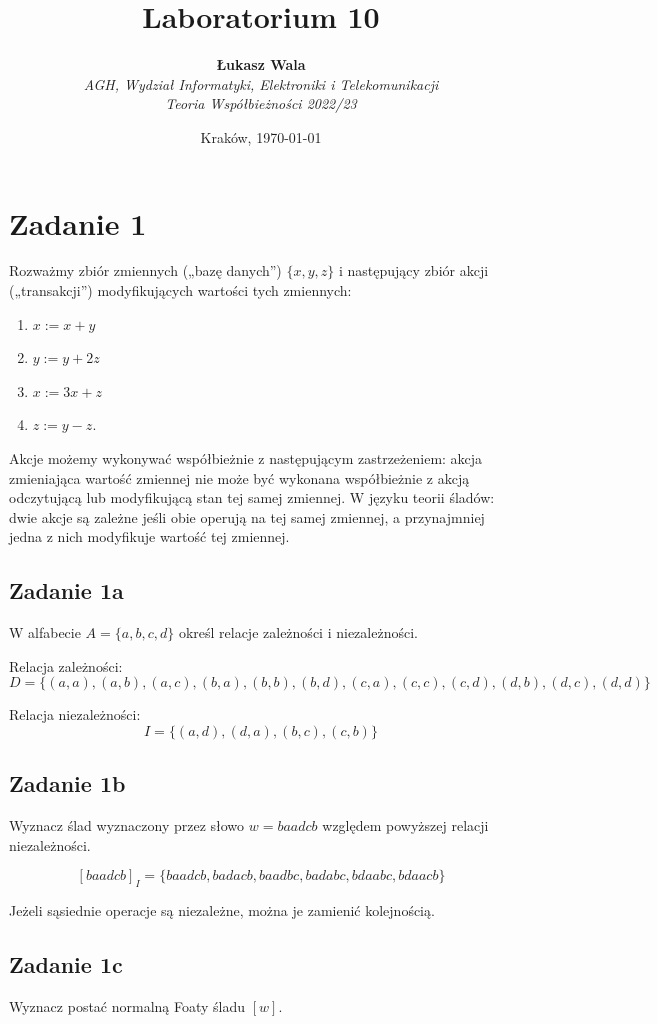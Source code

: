 \documentclass{article}
\title{Laboratorium 10}
\author{\textbf{Łukasz Wala}\\
    \textit{AGH, Wydział Informatyki, Elektroniki i Telekomunikacji} \\
    \textit{Teoria Współbieżności 2022/23}}
\date{Kraków, \today}
\begin{document}
\maketitle

\section{Zadanie 1}
Rozważmy zbiór zmiennych („bazę danych”) $\{x, y, z\}$
i następujący zbiór akcji („transakcji”) modyfikujących wartości tych zmiennych:

\begin{enumerate}[label=\alph*)]
    \item
    $x := x + y$
    \item
    $y := y + 2z$
    \item
    $x := 3x + z$
    \item
    $z := y - z$.
\end{enumerate}

Akcje możemy wykonywać współbieżnie z następującym zastrzeżeniem: akcja zmieniająca 
wartość zmiennej nie może być wykonana współbieżnie z akcją odczytującą lub modyfikującą 
stan tej samej zmiennej. W języku teorii śladów: dwie akcje są zależne jeśli obie operują 
na tej samej zmiennej, a przynajmniej jedna z nich modyfikuje wartość tej zmiennej.

\subsection{Zadanie 1a}
W alfabecie $A = \{ a, b, c, d\}$ określ relacje zależności i niezależności.

Relacja zależności:
$$ D = \{ (a,a), (a,b), (a,c), (b,a), (b,b), (b,d), (c,a), (c,c), (c,d), (d,b), (d,c), (d,d)\} $$

Relacja niezależności:
$$ I = \{ (a,d), (d,a), (b,c), (c,b)\} $$

\subsection{Zadanie 1b}
Wyznacz ślad wyznaczony przez słowo $w = baadcb$ względem powyższej relacji niezależności.

$$ [baadcb]_I = \{ baadcb, badacb, baadbc, badabc, bdaabc, bdaacb\} $$

Jeżeli sąsiednie operacje są niezależne, można je zamienić kolejnością.

\subsection{Zadanie 1c}
Wyznacz postać normalną Foaty śladu $[w]$.
\end{document}
